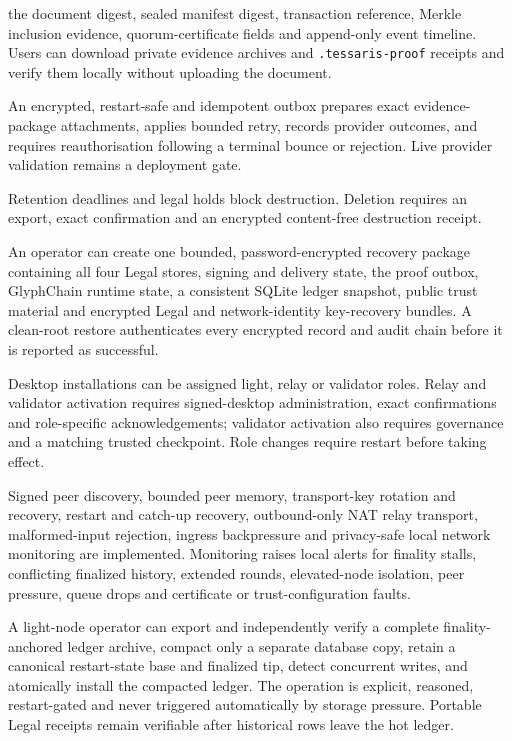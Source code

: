 \begin{description}
        the document digest, sealed manifest digest, transaction reference,
        Merkle inclusion evidence, quorum-certificate fields and append-only
        event timeline. Users can download private evidence archives and
        \texttt{.tessaris-proof} receipts and verify them locally without
        uploading the document.
  \item[Controlled signed-copy delivery.] An encrypted, restart-safe and
        idempotent outbox prepares exact evidence-package attachments, applies
        bounded retry, records provider outcomes, and requires reauthorisation
        following a terminal bounce or rejection. Live provider validation
        remains a deployment gate.
  \item[Records governance.] Retention deadlines and legal holds block
        destruction. Deletion requires an export, exact confirmation and an
        encrypted content-free destruction receipt.
  \item[Encrypted device recovery.] An operator can create one bounded,
        password-encrypted recovery package containing all four Legal stores,
        signing and delivery state, the proof outbox, GlyphChain runtime state,
        a consistent SQLite ledger snapshot, public trust material and
        encrypted Legal and network-identity key-recovery bundles. A clean-root
        restore authenticates every encrypted record and audit chain before it
        is reported as successful.
  \item[Explicit network participation.] Desktop installations can be assigned
        light, relay or validator roles. Relay and validator activation requires
        signed-desktop administration, exact confirmations and role-specific
        acknowledgements; validator activation also requires governance and a
        matching trusted checkpoint. Role changes require restart before taking
        effect.
  \item[Network operations.] Signed peer discovery, bounded peer memory,
        transport-key rotation and recovery, restart and catch-up recovery,
        outbound-only NAT relay transport, malformed-input rejection, ingress
        backpressure and privacy-safe local network monitoring are implemented.
        Monitoring raises local alerts for
        finality stalls, conflicting finalized history, extended rounds,
        elevated-node isolation, peer pressure, queue drops and certificate or
        trust-configuration faults.
  \item[Proof-preserving storage maintenance.] A light-node operator can export
        and independently verify a complete finality-anchored ledger archive,
        compact only a separate database copy, retain a canonical restart-state
        base and finalized tip, detect concurrent writes, and atomically install
        the compacted ledger. The operation is explicit, reasoned, restart-gated
        and never triggered automatically by storage pressure. Portable Legal
        receipts remain verifiable after historical rows leave the hot ledger.
\end{description}


